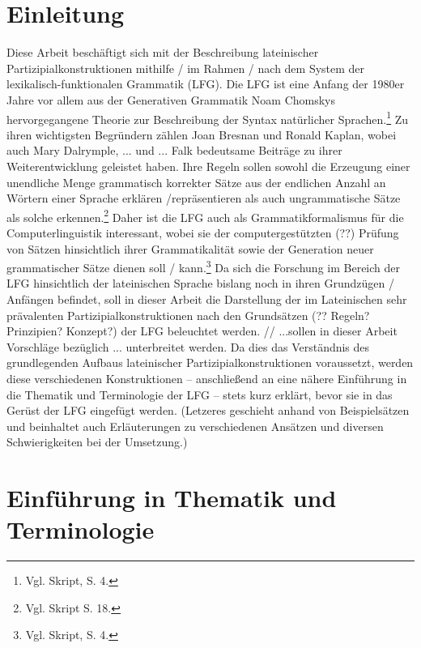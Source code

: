 \documentclass[12pt,a4paper]{article}
\begin{document}
\section{Einleitung}
Diese Arbeit beschäftigt sich mit der Beschreibung lateinischer Partizipialkonstruktionen mithilfe / im Rahmen / nach dem System der lexikalisch-funktionalen Grammatik (LFG). Die LFG ist eine Anfang der 1980er Jahre vor allem aus der Generativen Grammatik Noam Chomskys hervorgegangene Theorie zur Beschreibung der Syntax natürlicher Sprachen.\footnote{Vgl. Skript, S. 4.} Zu ihren wichtigsten Begründern zählen Joan Bresnan und Ronald Kaplan, wobei auch Mary Dalrymple, ... und ... Falk bedeutsame Beiträge zu ihrer Weiterentwicklung geleistet haben.
Ihre Regeln sollen sowohl die Erzeugung einer unendliche Menge grammatisch korrekter Sätze aus der endlichen Anzahl an Wörtern einer Sprache erklären /repräsentieren als auch ungrammatische Sätze als solche erkennen.\footnote{Vgl. Skript S. 18.} Daher ist die LFG auch als Grammatikformalismus für die Computerlinguistik interessant, wobei sie der computergestützten (??) Prüfung von Sätzen hinsichtlich ihrer Grammatikalität sowie der Generation neuer grammatischer Sätze dienen soll / kann.\footnote{Vgl. Skript, S. 4.}
Da sich die Forschung im Bereich der LFG hinsichtlich der lateinischen Sprache bislang noch in ihren Grundzügen / Anfängen befindet, soll in dieser Arbeit die Darstellung der im Lateinischen sehr prävalenten Partizipialkonstruktionen nach den Grundsätzen (?? Regeln? Prinzipien? Konzept?) der LFG beleuchtet werden. // ...sollen in dieser Arbeit Vorschläge bezüglich ... unterbreitet werden. Da dies das Verständnis des grundlegenden Aufbaus lateinischer Partizipialkonstruktionen voraussetzt, werden diese verschiedenen Konstruktionen  -- anschließend an eine nähere Einführung in die Thematik und Terminologie der LFG -- stets kurz erklärt, bevor sie in das Gerüst der LFG eingefügt werden. (Letzeres geschieht anhand von Beispielsätzen und beinhaltet auch Erläuterungen zu verschiedenen Ansätzen und diversen Schwierigkeiten bei der Umsetzung.)

\section{Einführung in Thematik und Terminologie}
\end{document}
